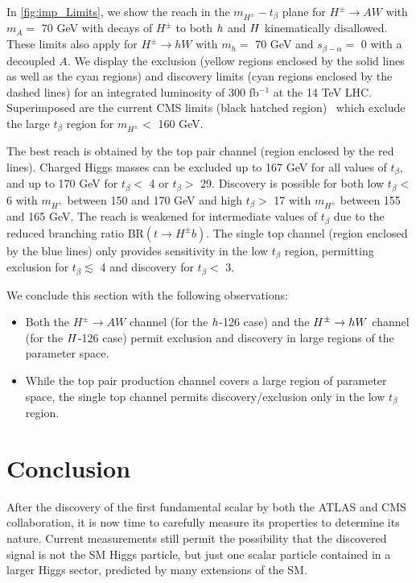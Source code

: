 In \autoref{fig:imp_Limits}, we show the reach in the $m_{H^{\pm}}-t_{\beta}$ plane for $H^{\pm} \rightarrow AW$ with $m_A=$ 70 GeV with decays of $H^\pm$ to both $h$ and $H$ kinematically disallowed. These limits also apply for $H^{\pm} \rightarrow hW$ with $m_{h}=$ 70 GeV and $s_{\beta-\alpha}=$ 0 with a decoupled $A$. We display the exclusion (yellow regions enclosed by the solid lines as well as the cyan regions) and discovery limits (cyan regions enclosed by the dashed lines) for an integrated luminosity of 300 fb$^{-1}$ at the 14 TeV LHC. Superimposed are the current CMS limits (black hatched region)~\cite{CMS:2014cdp} which exclude the large $t_{\beta}$ region for $m_{H^\pm}<$ 160 GeV. 

The best reach is obtained by the top pair channel (region enclosed by the red lines). Charged Higgs masses can be excluded up to 167 GeV for all values of $t_{\beta}$, and up to 170 GeV for $t_{\beta}<$ 4 or $t_{\beta}>$ 29. Discovery is possible for both low $t_{\beta}<$ 6 with $m_{H^\pm}$ between 150 and 170 GeV and high $t_{\beta} >$ 17 with $m_{H^\pm}$ between 155 and 165 GeV. The reach is weakened for intermediate values of $t_{\beta}$ due to the reduced branching ratio BR$(t \rightarrow H^{\pm} b)$. The single top channel (region enclosed by the blue lines) only provides sensitivity in the low $t_{\beta}$ region, permitting exclusion for $t_{\beta} \lesssim$ 4 and discovery for $t_\beta < $ 3. 

We conclude this section with the following observations: 
\begin{itemize}
\item Both the $H^{\pm} \rightarrow A W$ channel (for the $h$-126 case) and the $H^{\pm} \rightarrow h W$ channel (for the $H$-126 case) permit exclusion and discovery in large regions of the parameter space.

\item While the top pair production channel covers a large region of parameter space, the single top channel permits discovery/exclusion only in the low $t_{\beta}$ region.  
\end{itemize} 

\section{Conclusion}
\label{sec:light_charged_conclusion}
After the discovery of the first fundamental scalar by both the ATLAS and CMS collaboration, it is now time to carefully measure its properties to determine its nature. Current measurements still permit the possibility that the discovered signal is not the SM Higgs particle, but just one scalar particle contained in a larger Higgs sector, predicted by many extensions of the SM.

